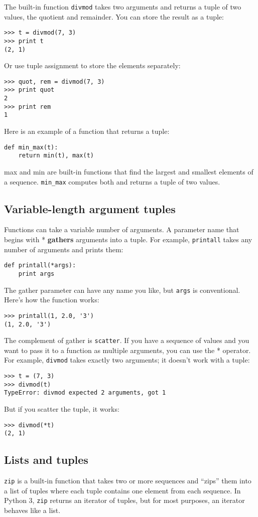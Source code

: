 \documentclass{article}
\begin{document}
The built-in function \verb|divmod| takes two arguments and returns a tuple
of two values, the quotient and remainder. You can store the result as
a tuple:
\begin{verbatim}
>>> t = divmod(7, 3)
>>> print t
(2, 1)
\end{verbatim}
Or use tuple assignment to store the elements separately:
\begin{verbatim}
>>> quot, rem = divmod(7, 3)
>>> print quot
2
>>> print rem
1
\end{verbatim}
Here is an example of a function that returns a tuple:
\begin{verbatim}
def min_max(t):
    return min(t), max(t)
\end{verbatim}
    max and min are built-in functions that find the largest and
    smallest elements of a sequence.
    \verb|min_max| computes both and returns
    a tuple of two values.

\subsection{Variable-length argument tuples}
Functions can take a variable number of arguments. A parameter name
that begins with * \textbf{gathers} arguments into a tuple. For example,
\verb|printall| takes any number of arguments and prints them:
\begin{verbatim}
def printall(*args):
    print args
\end{verbatim}
The gather parameter can have any name you like, but \verb|args| is
conventional. Here’s how the function works:
\begin{verbatim}
>>> printall(1, 2.0, '3')
(1, 2.0, '3')
\end{verbatim}
The complement of gather is \verb|scatter|. If you have a sequence of
values and you want to pass it to a function as multiple
arguments, you can use the * operator. For example,
\verb|divmod| takes
exactly two arguments; it doesn’t work with a tuple:
\begin{verbatim}
>>> t = (7, 3)
>>> divmod(t)
TypeError: divmod expected 2 arguments, got 1
\end{verbatim}
But if you scatter the tuple, it works:
\begin{verbatim}
>>> divmod(*t)
(2, 1)
\end{verbatim}

\subsection{Lists and tuples}
\verb|zip| is a built-in function that takes two or more sequences and
``zips'' them into a list of tuples where each tuple contains one element from
each sequence. In Python 3, \verb|zip| returns an iterator of tuples, but for
most purposes, an iterator behaves like a list.
\end{document}
